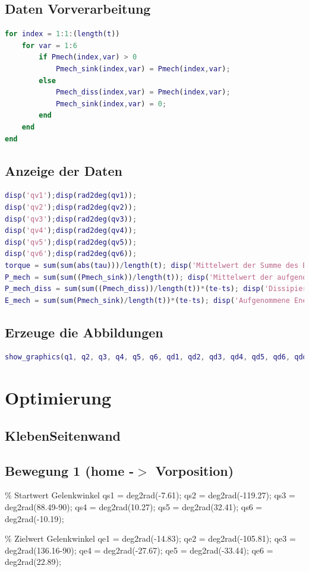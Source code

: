 \subsection{Daten Vorverarbeitung}
%
\begin{lstlisting}[language=Matlab, numbers=none]
for index = 1:1:(length(t))
	for var = 1:6
		if Pmech(index,var) > 0
			Pmech_sink(index,var) = Pmech(index,var);
		else
			Pmech_diss(index,var) = Pmech(index,var);
			Pmech_sink(index,var) = 0;
		end
	end
end
\end{lstlisting}
%
\subsection{Anzeige der Daten}
%
\begin{lstlisting}[language=Matlab, numbers=none]
disp('qv1');disp(rad2deg(qv1));
disp('qv2');disp(rad2deg(qv2));
disp('qv3');disp(rad2deg(qv3));
disp('qv4');disp(rad2deg(qv4));
disp('qv5');disp(rad2deg(qv5));
disp('qv6');disp(rad2deg(qv6));
torque = sum(sum(abs(tau)))/length(t); disp('Mittelwert der Summe des Betrags der Getriebe-Drehmomente in Nm'); disp(torque);
P_mech = sum(sum((Pmech_sink))/length(t)); disp('Mittelwert der aufgenommenen mechanischen Leistung in W'); disp(P_mech);
P_mech_diss = sum(sum((Pmech_diss))/length(t))*(te-ts); disp('Dissipierte Energie in J'); disp(P_mech_diss);
E_mech = sum(sum(Pmech_sink)/length(t))*(te-ts); disp('Aufgenommene Energie in J'); disp(E_mech);
\end{lstlisting}
%
\subsection{Erzeuge die Abbildungen}
%
\begin{lstlisting}[language=Matlab, numbers=none]
show_graphics(q1, q2, q3, q4, q5, q6, qd1, qd2, qd3, qd4, qd5, qd6, qdd1, qdd2, qdd3, qdd4, qdd5, qdd6, t, tau, Pmech)
\end{lstlisting}
%
%
\setcounter{section}{5}
\section{Optimierung}
\label{add:optimierer}
%
\subsection{KlebenSeitenwand}
%
\subsection{Bewegung 1 (home -\ensuremath{>} Vorposition)}
%
\begin{par}
	\% Startwert Gelenkwinkel qs1 = deg2rad(-7.61); qs2 = deg2rad(-119.27); qs3 = deg2rad(88.49-90); qs4 = deg2rad(10.27); qs5 = deg2rad(32.41); qs6 = deg2rad(-10.19);
\end{par} \vspace{1em}
\begin{par}
	\% Zielwert Gelenkwinkel qe1 = deg2rad(-14.83); qe2 = deg2rad(-105.81); qe3 = deg2rad(136.16-90); qe4 = deg2rad(-27.67); qe5 = deg2rad(-33.44); qe6 = deg2rad(22.89);
\end{par} \vspace{1em}
%
